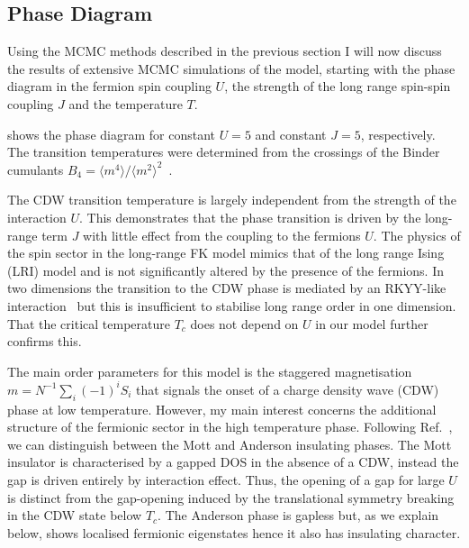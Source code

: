 \hypertarget{lrfk-results-phase-diagram}{%
\subsection{Phase Diagram}\label{lrfk-results-phase-diagram}}

Using the MCMC methods described in the previous section I will now discuss the results of extensive MCMC simulations of the model, starting with the phase diagram in the fermion spin coupling \(U\), the strength of the long range spin-spin coupling \(J\) and the temperature \(T\).

 shows the phase diagram for constant \(U=5\) and constant \(J=5\), respectively. The transition temperatures were determined from the crossings of the Binder cumulants \(B_4 = \langle m^4 \rangle /\langle m^2 \rangle^2\)~\autocite{binderFiniteSizeScaling1981}.

The CDW transition temperature is largely independent from the strength of the interaction \(U\). This demonstrates that the phase transition is driven by the long-range term \(J\) with little effect from the coupling to the fermions \(U\). The physics of the spin sector in the long-range FK model mimics that of the long range Ising (LRI) model and is not significantly altered by the presence of the fermions. In two dimensions the transition to the CDW phase is mediated by an RKYY-like interaction~\autocite{rusinCalculationRKKYRange2017} but this is insufficient to stabilise long range order in one dimension. That the critical temperature \(T_c\) does not depend on \(U\) in our model further confirms this.

The main order parameters for this model is the staggered magnetisation \(m = N^{-1} \sum_i (-1)^i S_i\) that signals the onset of a charge density wave (CDW) phase at low temperature. However, my main interest concerns the additional structure of the fermionic sector in the high temperature phase. Following Ref.~\autocite{antipovInteractionTunedAndersonMott2016}, we can distinguish between the Mott and Anderson insulating phases. The Mott insulator is characterised by a gapped DOS in the absence of a CDW, instead the gap is driven entirely by interaction effect. Thus, the opening of a gap for large \(U\) is distinct from the gap-opening induced by the translational symmetry breaking in the CDW state below \(T_c\). The Anderson phase is gapless but, as we explain below, shows localised fermionic eigenstates hence it also has insulating character.


